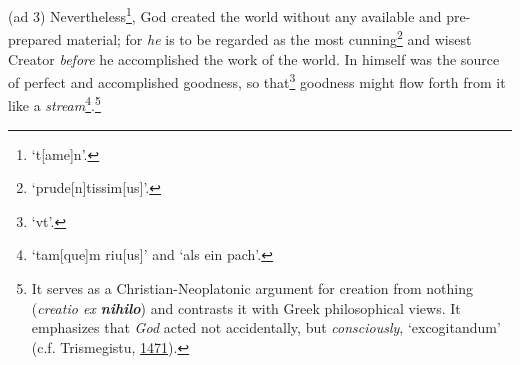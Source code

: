 \documentclass[
]{article}
\begin{document}
(ad 3) Nevertheless\footnote{`t{[}ame{]}n'.}, God created the world
without any available and pre-prepared material; for \emph{he} is to be
regarded as the most cunning\footnote{`prude{[}n{]}tissim{[}us{]}'.} and
wisest Creator \emph{before} he accomplished the work of the world. In himself
was the source of perfect and accomplished goodness, so that\footnote{`vt'.}
goodness might flow forth from it like a
\emph{stream}\footnote{`tam{[}que{]}m riu{[}us{]}' and `als ein pach'.}.\footnote{It
  serves as a Christian-Neoplatonic argument for creation from nothing
  (\emph{creatio ex \textbf{nihilo}}) and contrasts it with Greek
  philosophical views. It emphasizes that \emph{God} acted not
  accidentally, but \emph{consciously}, `excogitandum' (c.f.
  Trismegistu,
  \href{https://gdz.sub.uni-goettingen.de/id/PPN858183994}{1471}).}
\end{document}
